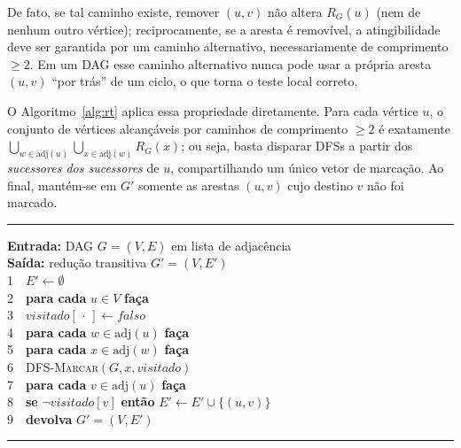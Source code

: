 \documentclass[10pt,twocolumn]{article}
\begin{document}
De fato, se tal caminho existe, remover $(u,v)$ não altera $R_G(u)$ (nem de nenhum outro vértice); reciprocamente, se a aresta é removível, a atingibilidade deve ser garantida por um caminho alternativo, necessariamente de comprimento $\geq 2$. Em um DAG esse caminho alternativo nunca pode usar a própria aresta $(u,v)$ ``por trás'' de um ciclo, o que torna o teste local correto.

O Algoritmo~\ref{alg:rt} aplica essa propriedade diretamente. Para cada vértice $u$, o conjunto de vértices alcançáveis por caminhos de comprimento $\geq 2$ é exatamente $\bigcup_{w \in \mathrm{adj}(u)} \bigcup_{x \in \mathrm{adj}(w)} R_G(x)$; ou seja, basta disparar DFSs a partir dos \emph{sucessores dos sucessores} de $u$, compartilhando um único vetor de marcação. Ao final, mantém-se em $G'$ somente as arestas $(u,v)$ cujo destino $v$ não foi marcado.

\begin{algoritmo}
\caption{Redução transitiva por caminhamento}
\label{alg:rt}
\hrule\vspace{1.5mm}
{\small
\textbf{Entrada:} DAG $G=(V,E)$ em lista de adjacência\\
\textbf{Saída:} redução transitiva $G'=(V,E')$\\[1mm]
\hspace*{0mm}1\ \ $E' \gets \emptyset$\\
\hspace*{0mm}2\ \ \textbf{para cada} $u \in V$ \textbf{faça}\\
\hspace*{4mm}3\ \ $\mathit{visitado}[\,\cdot\,] \gets \mathit{falso}$\\
\hspace*{4mm}4\ \ \textbf{para cada} $w \in \mathrm{adj}(u)$ \textbf{faça}\\
\hspace*{8mm}5\ \ \textbf{para cada} $x \in \mathrm{adj}(w)$ \textbf{faça}\\
\hspace*{12mm}6\ \ \textsc{DFS-Marcar}$(G, x, \mathit{visitado})$\\
\hspace*{4mm}7\ \ \textbf{para cada} $v \in \mathrm{adj}(u)$ \textbf{faça}\\
\hspace*{8mm}8\ \ \textbf{se} $\neg\mathit{visitado}[v]$ \textbf{então} $E' \gets E' \cup \{(u,v)\}$\\
\hspace*{0mm}9\ \ \textbf{devolva} $G'=(V,E')$
}
\vspace{1.5mm}\hrule
\end{algoritmo}
\end{document}
